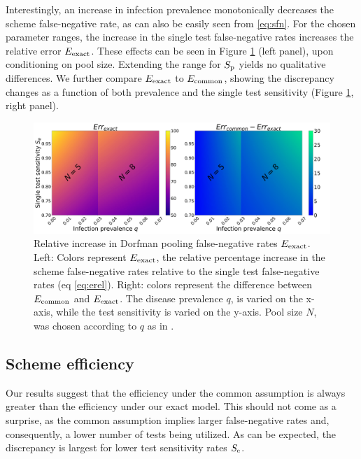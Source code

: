 \documentclass{article}
\begin{document}
Interestingly, an increase in infection prevalence monotonically
decreases the scheme false-negative rate, as can also be easily seen
from \eqref{eq:sfn}. For the chosen parameter ranges, the increase in
the single test false-negative rates increases the relative error
$E_{\text{{exact}}}$. These effects can be seen in Figure \ref{fig1} (left
panel), upon conditioning on pool size. Extending the range for $S_\text{p}$
yields no qualitative differences. We further compare $E_{\text{{exact}}}$ to
$E_{\text{{common}}}$, showing the discrepancy changes as a function of both
prevalence and the single test sensitivity (Figure \ref{fig1}, right
panel).
\begin{figure}[H]
  \centering
  \includegraphics[width=18cm]{heatmap_sfn.jpg}
  \caption{Relative increase in Dorfman pooling false-negative rates
    $E_{\text{{exact}}}$. Left: Colors represent $E_{\text{{exact}}}$, the relative
    percentage increase in the scheme false-negative rates relative
    to the single test false-negative rates (eq
    \eqref{eq:erel}). Right: colors represent the difference between
    $E_{\text{{common}}}$ and $E_{\text{{exact}}}$. The disease prevalence $q$, is
    varied on the x-axis, while the test sensitivity is varied on
    the y-axis. Pool size $N$, was chosen according to $q$ as in
    \cite{DorfmanYuvalDor}.}\label{fig1}
\end{figure}

\subsection{Scheme efficiency}
Our results suggest that the efficiency under the common assumption is
always greater than the efficiency under our exact model. This should
not come as a surprise, as the common assumption implies larger
false-negative rates and, consequently, a lower number of tests being
utilized. As can be expected, the discrepancy is largest for lower
test sensitivity rates $S_\text{e}$.
\end{document}
